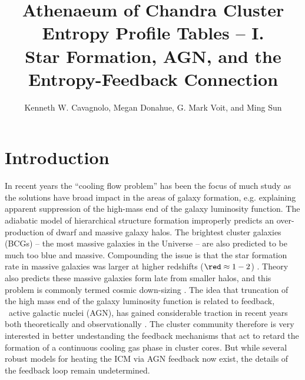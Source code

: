\documentclass{emulateapj}
\begin{document}
\title{Athenaeum of Chandra Cluster Entropy Profile Tables -- I.\\
Star Formation, AGN, and the Entropy-Feedback Connection}
\author{Kenneth W. Cavagnolo,
	Megan Donahue,
	G. Mark Voit, and
	Ming Sun}



\begin{abstract}
\end{abstract}


\keywords{ }

\section{Introduction}
\label{sec:intro}

In recent years the ``cooling flow problem'' has been the focus of
much study as the solutions have broad impact in the areas of galaxy
formation, e.g. explaining apparent suppression of the high-mass end
of the galaxy luminosity function. The adiabatic model of hierarchical
structure formation improperly predicts an over-production of dwarf
and massive galaxy halos. The brightest cluster galaxies (BCGs) -- the
most massive galaxies in the Universe -- are also predicted to be much
too blue and massive. Compounding the issue is that the star formation
rate in massive galaxies was larger at higher redshifts ($\red
\approx 1-2$) \citep{1996AJ....112..839C, 2005ApJ...619L.135J}. Theory
also predicts these massive galaxies form late from smaller halos, and
this problem is commonly termed cosmic down-sizing
\citep{1996AJ....112..839C}. The idea that truncation of the high mass
end of the galaxy luminosity function is related to feedback, \ie\
active galactic nuclei (AGN), has gained considerable traction in
recent years both theoretically \citep{2006MNRAS.370..645B,
2006MNRAS.365...11C} and observationally \citep{2003ApJ...590..207P,
2007ARA&A..45..117M}. The cluster community therefore is very
interested in better undestanding the feedback mechanisms that act to
retard the formation of a continuous cooling gas phase in cluster
cores. But while several robust models for heating the ICM via AGN
feedback now exist, the details of the feedback loop remain
undetermined.
\end{document}
